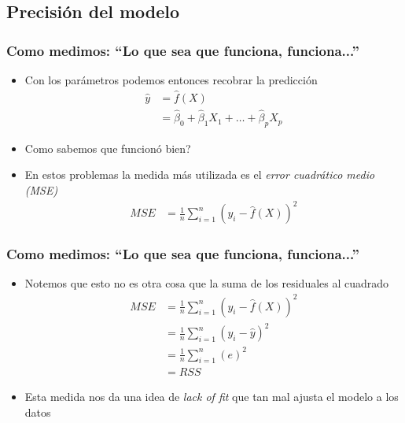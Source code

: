 \documentclass[
  shownotes,
  xcolor={svgnames},
  hyperref={colorlinks,citecolor=DarkBlue,linkcolor=DarkRed,urlcolor=DarkBlue}
  , aspectratio=169]{beamer}
\begin{document}
\subsection{Precisión del modelo}
\begin{frame}
\frametitle{Como medimos: ``Lo que sea que funciona, funciona...''}

\begin{itemize}
  \item Con los parámetros podemos entonces recobrar la predicción
    \begin{align}
      \hat{y} &= \hat{f}(X) \\
              &= \hat{\beta}_0 + \hat{\beta}_1 X_1 + \dots + \hat{\beta}_p X_p  
    \end{align}
\item Como sabemos que funcionó bien?
\pause
\item En estos problemas la medida más utilizada  es el {\it error cuadrático medio (MSE)} 
\begin{align}
MSE &= \frac{1}{n} \sum_{i=1}^n (y_i - \hat{f}(X) )^2
\end{align}
\end{itemize}


\end{frame}
\begin{frame}
\frametitle{Como medimos: ``Lo que sea que funciona, funciona...''}
\begin{itemize}
  \item Notemos que esto no es otra cosa que la suma de los residuales al cuadrado
  \begin{align}
  MSE &= \frac{1}{n} \sum_{i=1}^n (y_i - \hat{f}(X) )^2 \\ 
      &= \frac{1}{n} \sum_{i=1}^n (y_i - \hat{y} )^2 \\ 
      &= \frac{1}{n} \sum_{i=1}^n (e)^2 \\ 
      &= RSS
  \end{align}
  \item Esta medida nos da una idea de {\it lack of fit} que tan mal ajusta el modelo a los datos
\end{itemize}

\end{frame}
\end{document}
